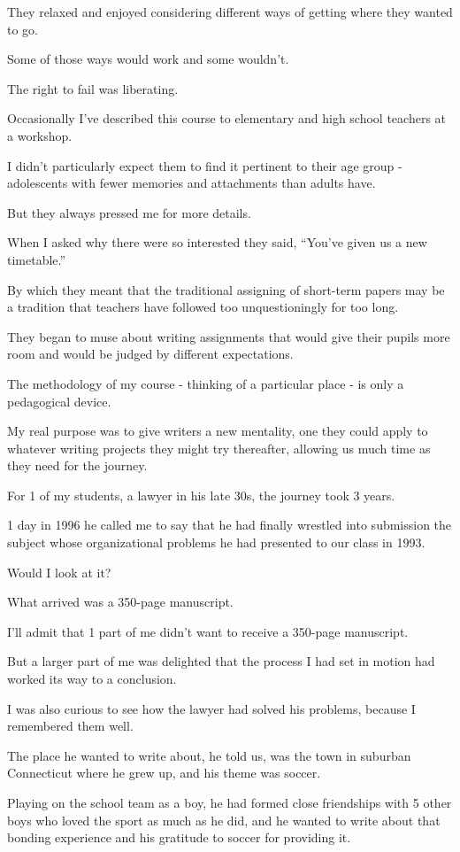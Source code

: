 \documentclass{book}
\numberwithin{equation}{section}
\begin{document}
They relaxed and enjoyed considering different ways of getting where they wanted to go.

Some of those ways would work and some wouldn't.

The right to fail was liberating.

%
Occasionally I've described this course to elementary and high school teachers at a workshop.

I didn't particularly expect them to find it pertinent to their age group - adolescents with fewer memories and attachments than adults have.

But they always pressed me for more details.

When I asked why there were so interested they said, ``You've given us a new timetable.''

By which they meant that the traditional assigning of short-term papers may be a tradition that teachers have followed too unquestioningly for too long.

They began to muse about writing assignments that would give their pupils more room and would be judged by different expectations.

%
The methodology of my course - thinking of a particular place - is only a pedagogical device.

My real purpose was to give writers a new mentality, one they could apply to whatever writing projects they might try thereafter, allowing us much time as they need for the journey.

For 1 of my students, a lawyer in his late 30s, the journey took 3 years.

1 day in 1996 he called me to say that he had finally wrestled into submission the subject whose organizational problems he had presented to our class in 1993.

Would I look at it?

%
What arrived was a 350-page manuscript.

I'll admit that 1 part of me didn't want to receive a 350-page manuscript.

But a larger part of me was delighted that the process I had set in motion had worked its way to a conclusion.

I was also curious to see how the lawyer had solved his problems, because I remembered them well.

%
The place he wanted to write about, he told us, was the town in suburban Connecticut where he grew up, and his theme was soccer.

Playing on the school team as a boy, he had formed close friendships with 5 other boys who loved the sport as much as he did, and he wanted to write about that bonding experience and his gratitude to soccer for providing it.
\end{document}
